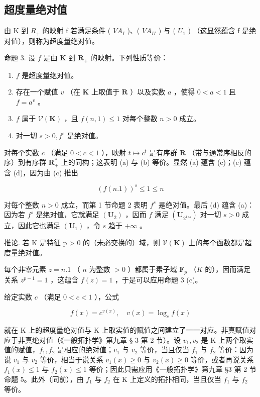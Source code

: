 \subsection{超度量绝对值}

由 K 到 \(R_{+}\) 的映射 f 若满足条件 ( \(VA_{I}\) )、( \(VA_{II}\) ) 与 ( \(U_{1}\) ) （这显然蕴含 f 是绝对值），则称为超度量绝对值。

命题 3. 设 \(f\) 是由 \(\mathbf{K}\) 到 \(\mathbf{R}_+\) 的映射。下列性质等价：

\begin{enumerate}
\def\labelenumi{(\alph{enumi})}
\item
  \(f\) 是超度量绝对值。
\item
  存在一个赋值 \(v\) （在 \(\mathbf{K}\) 上取值于 \(\mathbf{R}\) ）以及实数 \(a\) ，使得 \(0 < a < 1\) 且 \(f = a^v\) 。
\item
  \(f\) 属于 \(\mathcal{V}(\mathbf{K})\) ，且 \(f(n,1) \leqslant 1\) 对每个整数 \(n > 0\) 成立。
\item
  对一切 \(s > 0, f^s\) 是绝对值。
\end{enumerate}

对每个实数 \(c\) （满足 \(0 < c < 1\) ），映射 \(t \mapsto c^t\) 是有序群 \(\mathbf{R}\) （带与通常序相反的序）到有序群 \(\mathbf{R}_+^*\) 上的同构；这表明 (a) 与 (b) 等价。显然 (a) 蕴含 (c)；(c) 蕴含 (d)，因为由 (c) 推出

\[
(f (n. 1)) ^ {s} \leqslant 1 \leqslant n
\]

对每个整数 \(n > 0\) 成立，而第 1 节命题 2 表明 \(f^s\) 是绝对值。最后 (d) 蕴含 (a)：因为若 \(f^s\) 是绝对值，它就满足 \((\mathbf{U}_2)\) ，因而 \(f\) 满足 \((\mathbf{U}_{2^{1 / s}})\) 对一切 \(s > 0\) 成立，因此它也满足 \((\mathbf{U}_1)\) ，令 \(s\) 趋于 \(+\infty\) 。

推论. 若 K 是特征 p > 0 的（未必交换的）域，则 \(\mathcal{V}(\mathbf{K})\) 上的每个函数都是超度量绝对值。

每个非零元素 \(z = n.1\) （ \(n\) 为整数 \(>0\) ）都属于素子域 \(\mathbf{F}_p\) （\(K\) 的），因而满足关系 \(z^{p-1} = 1\) ，这蕴含 \(f(z) = 1\) ，于是可以应用命题 3 (c)。

给定实数 \(c\) （满足 \(0 < c < 1\) ），公式

\[
f (x) = c ^ {v (x)}, \quad v (x) = \log_ {c} f (x)
\]

就在 K 上的超度量绝对值与 K 上取实值的赋值之间建立了一一对应。非真赋值对应于非真绝对值（《一般拓扑学》第九章 § 3 第 2 节）。设 \(v_{1}, v_{2}\) 是 K 上两个取实值的赋值，\(f_{1}, f_{2}\) 是相应的绝对值；\(v_{1}\) 与 \(v_{2}\) 等价，当且仅当 \(f_{1}\) 与 \(f_{2}\) 等价：因为说 \(v_{1}\) 与 \(v_{2}\) 等价，相当于说关系 \(v_{1}(x) \geqslant 0\) 与 \(v_{2}(x) \geqslant 0\) 等价，或者再说关系 \(f_{1}(x) \leqslant 1\) 与 \(f_{2}(x) \leqslant 1\) 等价；因此只需应用《一般拓扑学》第九章 §3 第 2 节命题 5。此外（同前），由 \(f_{1}\) 与 \(f_{2}\) 在 K 上定义的拓扑相同，当且仅当 \(f_{1}\) 与 \(f_{2}\) 等价。

